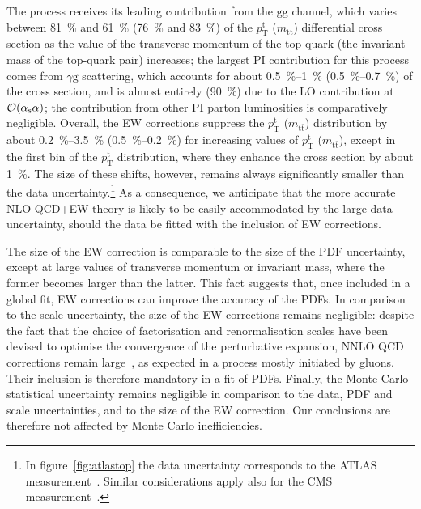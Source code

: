 The process receives its leading contribution from the $\mathrm{gg}$ channel,
which varies between \SI{81}{\percent} and \SI{61}{\percent} (\SI{76}{\percent} and \SI{83}{\percent}) of the $p_\mathrm{T}^\mathrm{t}$
($m_{\mathrm{t}\bar{\mathrm{t}}}$) differential cross section as the value of the
transverse momentum of the top quark (the invariant mass of the top-quark pair)
increases; the largest PI contribution for this process comes from $\gamma\mathrm{g}$ scattering,
which accounts for about \SIrange{0.5}{1}{\percent} (\SIrange{0.5}{0.7}{\percent}) of the cross
section, and is almost entirely (\SI{90}{\percent}) due to the LO contribution at $\mathcal{O}(\alpha_\mathrm{s}\alpha)$; the contribution from other PI parton luminosities is comparatively
negligible. Overall, the EW corrections suppress the $p_\mathrm{T}^\mathrm{t}$
($m_{\mathrm{t}\bar{\mathrm{t}}}$) distribution by about \SIrange{0.2}{3.5}{\percent}
(\SIrange{0.5}{0.2}{\percent}) for increasing values of $p_\mathrm{T}^\mathrm{t}$
($m_{\mathrm{t}\bar{\mathrm{t}}}$), except in the first bin of the
$p_\mathrm{T}^\mathrm{t}$ distribution, where they enhance the cross section by
about \SI{1}{\percent}. The size of these shifts, however, remains always significantly
smaller than the data uncertainty.\footnote{In
  figure~\ref{fig:atlastop} the data uncertainty corresponds to the ATLAS
  measurement~\cite{Aad:2015auj}. Similar considerations apply also for the CMS
  measurement~\cite{Khachatryan:2015oaa}.}
As a consequence, we anticipate that the more accurate NLO QCD+EW theory is
likely to be easily accommodated by the large data uncertainty, should the data
be fitted with the inclusion of EW corrections.

The size of the EW correction is comparable to the size of the PDF uncertainty,
except at large values of transverse momentum or invariant mass, where the
former becomes larger than the latter. This fact suggests that, once included in
a global fit, EW corrections can improve the accuracy of the PDFs. In comparison
to the scale uncertainty, the size of the EW corrections remains negligible:
despite the fact that the choice of factorisation and renormalisation scales
have been devised to optimise the convergence of the perturbative expansion,
NNLO QCD corrections remain large~\cite{Czakon:2013goa,Czakon:2014xsa,Czakon:2015owf,Czakon:2016ckf,Catani:2019iny,Behring:2019iiv,Catani:2019hip,Catani:2020tko,Czakon:2020qbd}, as expected in a process mostly initiated
by gluons. Their inclusion is therefore mandatory in a fit of PDFs. Finally,
the Monte Carlo statistical uncertainty remains negligible in comparison to the
data, PDF and scale uncertainties, and to the size of the EW correction. Our
conclusions are therefore not affected by Monte Carlo inefficiencies.

